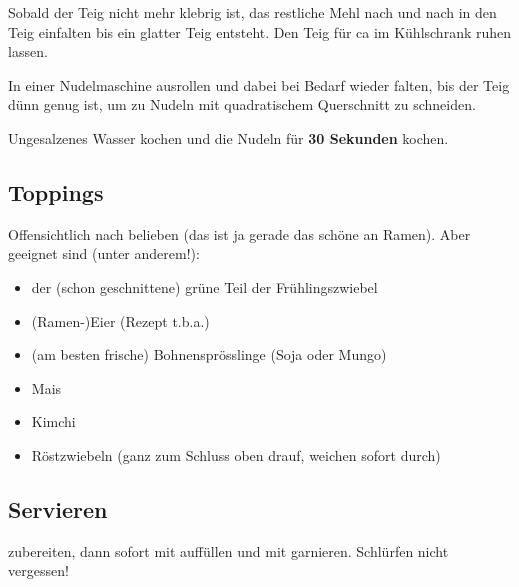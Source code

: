 Sobald der Teig nicht mehr klebrig ist, das restliche Mehl nach und nach in den Teig einfalten bis ein glatter Teig entsteht.
Den Teig für ca  im Kühlschrank ruhen lassen.

In einer Nudelmaschine ausrollen und dabei bei Bedarf wieder falten, bis der Teig dünn genug ist, um zu Nudeln mit quadratischem Querschnitt zu schneiden.

Ungesalzenes Wasser kochen und die Nudeln für \textbf{30 Sekunden} kochen.
\subsection*{Toppings}\label{subsec:ramen_toppings}
Offensichtlich nach belieben (das ist ja gerade das schöne an Ramen).
Aber geeignet sind (unter anderem!):
\begin{itemize}
	\item der (schon geschnittene) grüne Teil der Frühlingszwiebel
	\item (Ramen-)Eier (Rezept t.b.a.)
	\item (am besten frische) Bohnensprösslinge (Soja oder Mungo)
	\item Mais
	\item Kimchi
	\item Röstzwiebeln (ganz zum Schluss oben drauf, weichen sofort durch)
\end{itemize}
\subsection*{Servieren}
 zubereiten, dann sofort mit  auffüllen und mit  garnieren.
Schlürfen nicht vergessen!